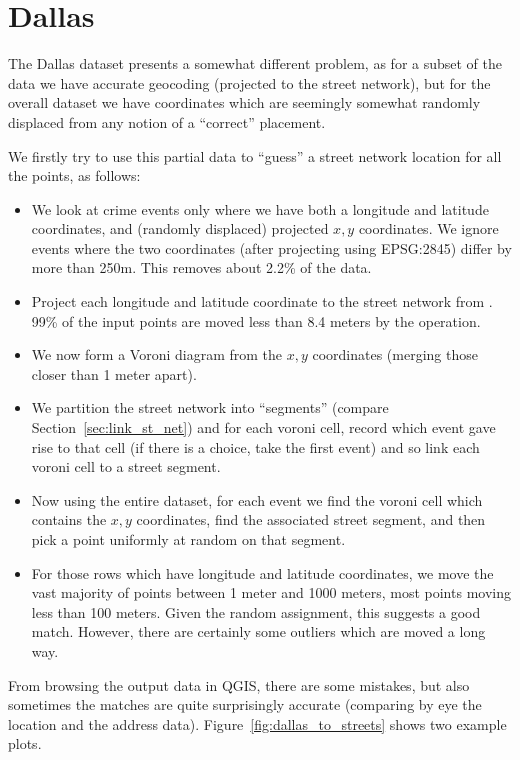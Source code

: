 \documentclass[twoside,a4paper,twocolumn,10pt]{article}
\theoremstyle{plain}
\theoremstyle{definition}
\begin{document}
\section{Dallas}\label{sec:dallas}

The Dallas dataset presents a somewhat different problem, as for a subset of the data we
have accurate geocoding (projected to the street network), but for the overall dataset we
have coordinates which are seemingly somewhat randomly displaced from any notion of a
``correct'' placement.

We firstly try to use this partial data to ``guess'' a street network location for all the
points, as follows:
\begin{itemize}
\item We look at crime events only where we have both a longitude and latitude coordinates,
  and (randomly displaced) projected $x,y$ coordinates.  We ignore events where the two
  coordinates (after projecting using EPSG:2845) differ by more than 250m.  This removes about
  2.2\% of the data.
\item Project each longitude and latitude coordinate to the street network from
  \cite{dstreets}.  99\% of the input points are moved less than 8.4 meters by the operation.
\item We now form a Voroni diagram from the $x,y$ coordinates (merging those closer than
  1 meter apart).
\item We partition the street network into ``segments'' (compare Section~\ref{sec:link_st_net})
  and for each voroni cell, record which event gave rise to that cell (if there is a choice,
  take the first event) and so link each voroni cell to a street segment.
\item Now using the entire dataset, for each event we find the voroni cell which contains
  the $x,y$ coordinates, find the associated street segment, and then pick a point uniformly
  at random on that segment.
\item For those rows which have longitude and latitude coordinates, we move the vast majority
  of points between 1 meter and 1000 meters, most points moving less than 100 meters.  Given
  the random assignment, this suggests a good match.  However, there are certainly some
  outliers which are moved a long way.
\end{itemize}

From browsing the output data in QGIS, there are some mistakes, but also sometimes the matches
are quite surprisingly accurate (comparing by eye the location and the address data).
Figure~\ref{fig:dallas_to_streets} shows two example plots.
\end{document}
